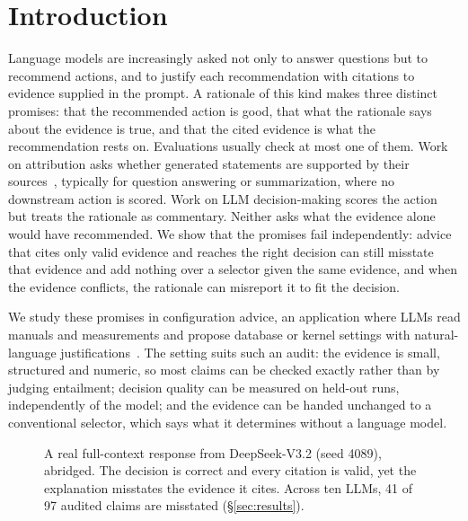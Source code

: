 \section{Introduction}
\label{sec:introduction}
Language models are increasingly asked not only to answer questions but to recommend actions, and to justify each recommendation with citations to evidence supplied in the prompt. A rationale of this kind makes three distinct promises: that the recommended action is good, that what the rationale says about the evidence is true, and that the cited evidence is what the recommendation rests on. Evaluations usually check at most one of them. Work on attribution asks whether generated statements are supported by their sources~\cite{Rashkin2023AIS,Gao2023ALCE,Min2023FActScore,Liu2023Verifiability}, typically for question answering or summarization, where no downstream action is scored. Work on LLM decision-making scores the action~\cite{Yang2024OPRO,Lao2024GPTuner,Giannakouris2025LambdaTune} but treats the rationale as commentary. Neither asks what the evidence alone would have recommended. We show that the promises fail independently: advice that cites only valid evidence and reaches the right decision can still misstate that evidence and add nothing over a selector given the same evidence, and when the evidence conflicts, the rationale can misreport it to fit the decision.

We study these promises in configuration advice, an application where LLMs read manuals and measurements and propose database or kernel settings with natural-language justifications~\cite{Trummer2022DBBERT,Lao2024GPTuner,Giannakouris2025LambdaTune,Chen2024AutoOS,Lin2025TuneAgent}. The setting suits such an audit: the evidence is small, structured and numeric, so most claims can be checked exactly rather than by judging entailment; decision quality can be measured on held-out runs, independently of the model; and the evidence can be handed unchanged to a conventional selector, which says what it determines without a language model.

\begin{figure}[t]
\centering\small
{}
\caption{A real full-context response from DeepSeek-V3.2 (seed 4089), abridged. The decision is correct and every citation is valid, yet the explanation misstates the evidence it cites. Across ten LLMs, 41 of 97 audited claims are misstated (\S\ref{sec:results}).}
\label{fig:teaser}
\end{figure}

